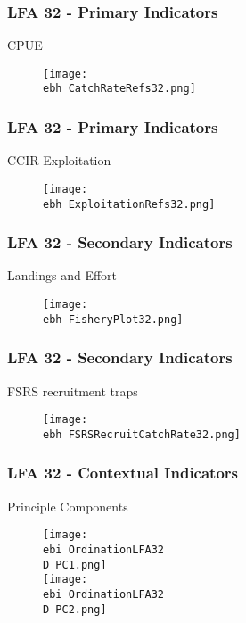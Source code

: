 \documentclass{beamer}
\newcommand{\ebh}{\string~/bio.data/bio.lobster/figures/Assessment/LFA2732/} %
\newcommand{\ebi}{\string~/bio.data/bio.lobster/figures/Assessment/Indicators/} %
\newcommand{\D}{.}
\begin{document}
\begin{frame}
\frametitle{LFA 32 - Primary Indicators}
CPUE
\begin{figure}
        \begin{center}
            \texttt{[image: \\ebh CatchRateRefs32.png]}
        \end{center}
    \end{figure}
\end{frame}



\begin{frame}
\frametitle{LFA 32 - Primary Indicators}
CCIR Exploitation 
\begin{figure}
        \begin{center}
            \texttt{[image: \\ebh ExploitationRefs32.png]}
        \end{center}
    \end{figure}
\end{frame}




\begin{frame}
\frametitle{LFA 32 - Secondary Indicators}
Landings and Effort
\begin{figure}
        \begin{center}
            \texttt{[image: \\ebh FisheryPlot32.png]}
        \end{center}
    \end{figure}
\end{frame}



\begin{frame}
\frametitle{LFA 32 - Secondary Indicators}
FSRS recruitment traps
\begin{figure}
        \begin{center}
            \texttt{[image: \\ebh FSRSRecruitCatchRate32.png]}
        \end{center}
    \end{figure}
\end{frame}



\begin{frame}
\frametitle{LFA 32 - Contextual Indicators}
Principle Components
\begin{figure}
        \begin{center}
            \texttt{[image: \\ebi OrdinationLFA32\\D PC1.png]}\\
            \texttt{[image: \\ebi OrdinationLFA32\\D PC2.png]}
        \end{center}
    \end{figure}
\end{frame}
\end{document}
